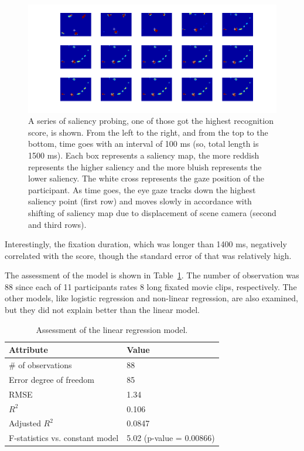 \documentclass[10pt,letterpaper]{article}
\begin{document}
\begin{figure}
  \centerline{\includegraphics[width=150mm]{./eps/probing.png}}
  \caption[A series of saliency probing]{A series of saliency probing, one of those got the highest recognition score, is shown. From the left to the right, and from the top to the bottom, time goes with an interval of 100 ms (so, total length is 1500 ms). Each box represents a saliency map, the more reddish represents the higher saliency and the more bluish represents the lower saliency. The white cross represents the gaze position of the participant. As time goes, the eye gaze tracks down the highest saliency point (first row) and moves slowly in accordance with shifting of saliency map due to displacement of scene camera (second and third rows).}
  \label{fig:probing}
\end{figure}

Interestingly, the fixation duration, which was longer than 1400 ms, negatively correlated with the score, though the standard error of that was relatively high. 

The assessment of the model is shown in Table~\ref{tab:lr-goodness}. The number of observation was 88 since each of 11 participants rates 8 long fixated movie clips, respectively. The other models, like logistic regression and non-linear regression, are also examined, but they did not explain better than the linear model.

\begin{table}[ht]
\begin{center} 
\caption{Assessment of the linear regression model.} 
\vskip 0.12in
\label{tab:lr-goodness} 
\begin{tabular}{ll} 
\hline
Attribute   & Value \\ 
\hline
\# of observations & 88 \\
Error degree of freedom & 85 \\
RMSE & 1.34 \\
$R^{2}$ & 0.106 \\
Adjusted $R^{2}$ & 0.0847 \\
F-statistics vs. constant model & 5.02 (p-value = 0.00866) \\
\hline
\end{tabular} 
\end{center} 
\end{table}
\end{document}
